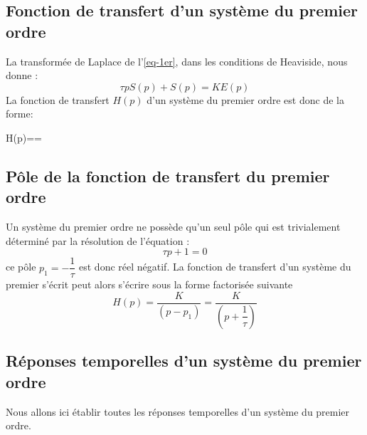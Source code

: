 \subsection{Fonction de transfert d'un système du premier ordre}
La transformée de Laplace de l'\cref{eq-1er}, dans les conditions de Heaviside, nous donne :
$$
\tau pS(p)+S(p)=KE(p)
$$
La fonction de transfert $H(p)$ d'un système du premier ordre est donc de la forme:
\begin{bequation}
    H(p)==\label{eq-ft1er}
\end{bequation}

\subsection{Pôle de la fonction de transfert du premier ordre}
Un système du premier ordre ne possède qu'un seul pôle qui est trivialement 
déterminé par la résolution de l'équation :
$$
\tau p + 1 =0
$$
ce pôle $p_1=-\dfrac{1}{\tau}$ est donc réel négatif.
La fonction de transfert d'un système du premier s'écrit peut alors s'écrire sous la forme factorisée suivante
$$
H(p)=\dfrac{K}{(p-p_1)}=\dfrac{K}{\left(p+\dfrac{1}{\tau}\right)}
$$

\subsection{Réponses temporelles d'un système du premier ordre}
Nous allons ici établir toutes les réponses temporelles d'un système du premier ordre.

